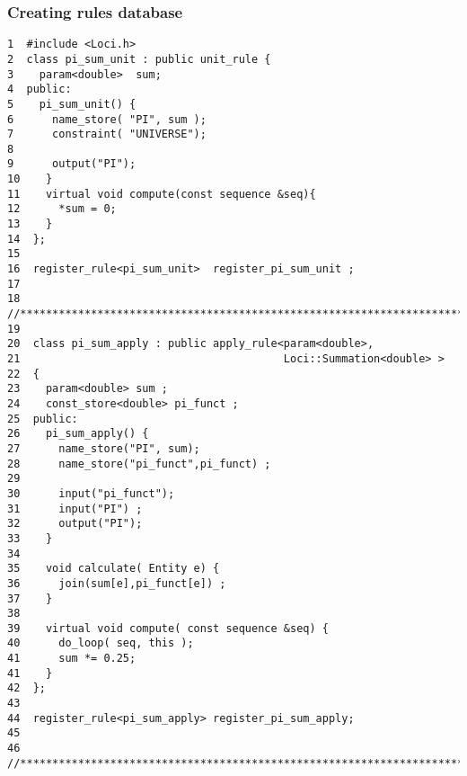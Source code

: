 \subsubsection { Creating rules database }
\begin{verbatim}
1  #include <Loci.h>
2  class pi_sum_unit : public unit_rule {
3    param<double>  sum;
4  public:
5    pi_sum_unit() {
6      name_store( "PI", sum );
7      constraint( "UNIVERSE");
8
9      output("PI");
10    }
11    virtual void compute(const sequence &seq){
12      *sum = 0;
13    }
14  };
15
16  register_rule<pi_sum_unit>  register_pi_sum_unit ;
17
18  //*********************************************************************
19
20  class pi_sum_apply : public apply_rule<param<double>,
21                                         Loci::Summation<double> >
22  {
23    param<double> sum ;
24    const_store<double> pi_funct ;
25  public:
26    pi_sum_apply() {
27      name_store("PI", sum);
28      name_store("pi_funct",pi_funct) ;
29
30      input("pi_funct");
31      input("PI") ;
32      output("PI");
33    }
34
35    void calculate( Entity e) {
36      join(sum[e],pi_funct[e]) ;
37    }
38
39    virtual void compute( const sequence &seq) {
40      do_loop( seq, this );
41      sum *= 0.25;
41    }
42  };
43
44  register_rule<pi_sum_apply> register_pi_sum_apply;
45
46  //*********************************************************************
\end{verbatim}
